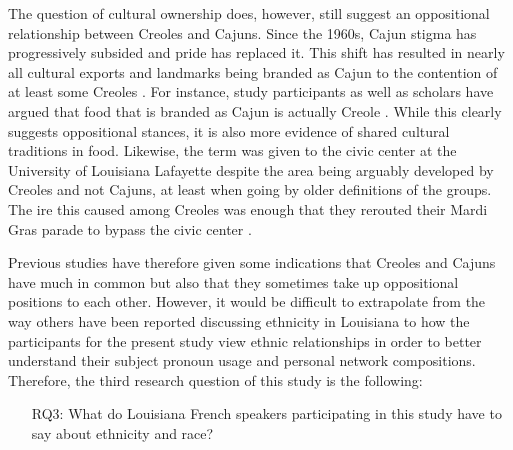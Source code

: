   The question of cultural ownership does, however, still suggest an oppositional relationship between Creoles and Cajuns.
  Since the 1960s, Cajun stigma has progressively subsided and pride has replaced it.
  This shift has resulted in nearly all cultural exports and landmarks being branded as Cajun to the contention of at least some Creoles \parencite{giancarlo_dont_2019}.
  For instance, study participants as well as scholars have argued that food that is branded as Cajun is actually Creole \parencite[pp.~39-40]{giancarlo_dont_2019}.
  While this clearly suggests oppositional stances, it is also more evidence of shared cultural traditions in food.
  Likewise, the term  was given to the civic center at the University of Louisiana Lafayette despite the area being arguably developed by Creoles and not Cajuns, at least when going by older definitions of the groups.
  The ire this caused among Creoles was enough that they rerouted their Mardi Gras parade to bypass the civic center \parencite[p.~36]{giancarlo_dont_2019}.

  Previous studies have therefore given some indications that Creoles and Cajuns have much in common but also that they sometimes take up oppositional positions to each other.
  However, it would be difficult to extrapolate from the way others have been reported discussing ethnicity in Louisiana to how the participants for the present study view ethnic relationships in order to better understand their subject pronoun usage and personal network compositions.
  Therefore, the third research question of this study is the following:
  \begin{itemize}
    \item[RQ3:] What do Louisiana French speakers participating in this study have to say about ethnicity and race?
  \end{itemize}
